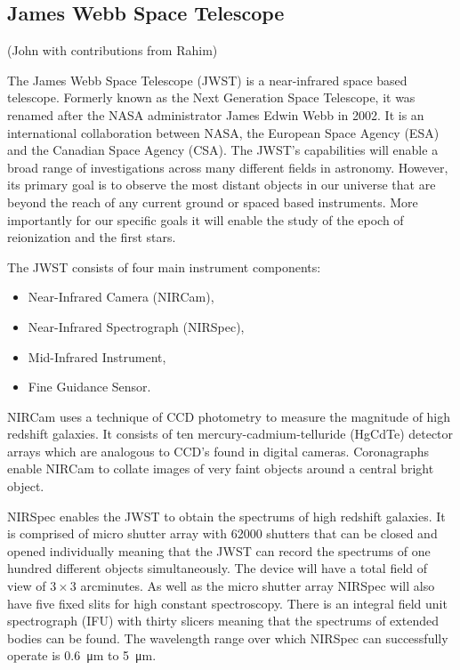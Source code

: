 
\subsection{James Webb Space Telescope} %
\label{sub:james_webb_space_telescope}
(John with contributions from Rahim)

	The James Webb Space Telescope (JWST) is a near-infrared space based telescope. Formerly known as the Next Generation Space Telescope, it was renamed after the NASA administrator James Edwin Webb in 2002. It is an international collaboration between NASA, the European Space Agency (ESA) and the Canadian Space Agency (CSA). The JWST's capabilities will enable a broad range of investigations across many different fields in astronomy. However, its primary goal is to observe the most distant objects in our universe that are beyond the reach of any current ground or spaced based instruments. More importantly for our specific goals it will enable the study of the epoch of reionization and the first stars\cite{primary_mirror_construction}.

	The JWST consists of four main instrument components:
	\begin{itemize}
		\item Near-Infrared Camera (NIRCam),
		\item Near-Infrared Spectrograph (NIRSpec),
		\item Mid-Infrared Instrument,
		\item Fine Guidance Sensor.
	\end{itemize}

	NIRCam uses a technique of CCD photometry to measure the magnitude of high redshift galaxies. It consists of ten mercury-cadmium-telluride (HgCdTe) detector arrays which are analogous to CCD's found in digital cameras. Coronagraphs enable NIRCam to collate images of very faint objects around a central bright object\cite{primary_mirror_construction}.

	NIRSpec enables the JWST to obtain the spectrums of high redshift galaxies. It is comprised of micro shutter array with \num{62000} shutters that can be closed and opened individually meaning that the JWST can record the spectrums of one hundred different objects simultaneously. The device will have a total field of view of $3\times3$ arcminutes. As well as the micro shutter array NIRSpec will also have five fixed slits for high constant spectroscopy. There is an integral field unit spectrograph (IFU) with thirty slicers meaning that the spectrums of extended bodies can be found. The wavelength range over which NIRSpec can successfully operate is \SI{0.6}{\micro\metre} to \SI{5}{\micro\metre}\cite{primary_mirror_construction}.

